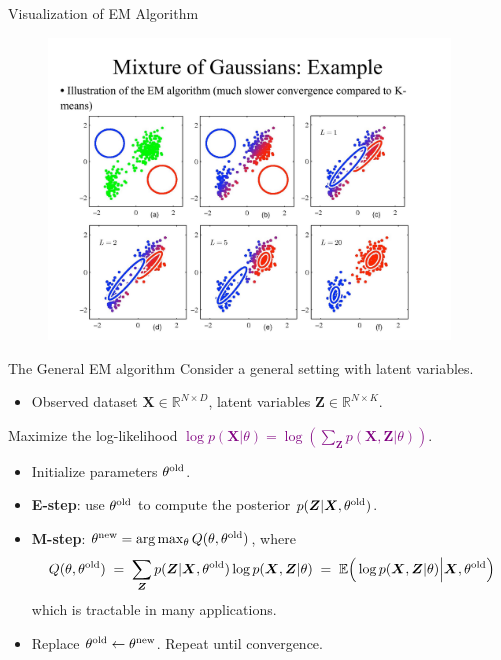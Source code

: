 \documentclass[11pt,handout,aspectratio=169]{beamer}
\begin{document}

\begin{frame}{Visualization of EM Algorithm}
\begin{figure}
\includegraphics[width=4.2in]{pics/raw3.pdf}
\end{figure}
\end{frame}


\begin{frame}{The General EM algorithm}
Consider a general setting with latent variables.
\begin{itemize}
	\item Observed dataset $\boldsymbol{X}\in \mathbb R^{N\times D}$, latent variables $\boldsymbol{Z}\in \mathbb R^{N\times K}$.
	\end{itemize}
Maximize the log-likelihood  \textcolor{purple}{$\log p(\boldsymbol{X}|\theta)=\log\left(\sum_{\boldsymbol Z}p(\boldsymbol X,\boldsymbol Z|\theta)\right)$}.
\begin{itemize}
	\item Initialize parameters $\theta^{\rm old}$.
	 \item \textbf{E-step}: use $\theta^{\rm old}$ to compute the posterior $p(\boldsymbol{Z}|\boldsymbol{X},\theta^{\rm old})$.
 	\item \textbf{M-step}: $\theta^{\rm new}=\arg\max_\theta Q(\theta,\theta^{\rm old})$, where
$$
	Q(\theta,\theta^{\rm old})\;=\;\sum_{\boldsymbol{Z}}p(\boldsymbol{Z}|\boldsymbol{X},\theta^{\rm old})\log p(\boldsymbol{X},\boldsymbol{Z}|\theta)\;=\;\mathbb E\Big(\log p(\boldsymbol{X},\boldsymbol{Z}|\theta)\Big|\boldsymbol{X},\theta^{\rm old}\Big)
$$
which is tractable in many applications.
\item Replace $\theta^{\rm old}\leftarrow\theta^{\rm new}$. Repeat until convergence.
\end{itemize}
\end{frame}
\end{document}
